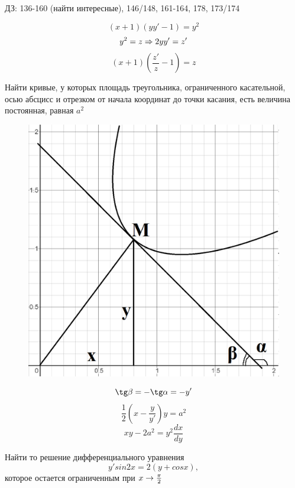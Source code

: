 \documentclass[12pt, fleqn]{article}
\begin{document}
    ДЗ: 136-160 (найти интересные), 146/148, 161-164, 178, 173/174

    \begin{Example}[162]
        \[(x+1)(y y'-1)=y^2\]
        \[y^2=z \Rightarrow 2y y'=z'\]
        \[(x+1)(\dfrac{z'}{z}-1)=z\]
    \end{Example}

    \begin{example}
      Найти кривые, у которых площадь треугольника, ограниченного касательной, осью абсцисс и отрезком от начала координат до точки касания, есть величина постоянная, равная $a^2$
      \begin{figure}[H]
    	    \includegraphics[scale=0.2]{pics/resh6.png}
    	    \centering
    	\end{figure}
      \[\tg \beta = - \tg \alpha = -y'\]
      \[\frac{1}{2} (x-\frac{y}{y'})y=a^2\]
      \[x y - 2a^2 = y^2 \frac{dx}{dy}\]
    \end{example}

    \begin{example}
      Найти то решение дифференциального уравнения
      \[y' sin 2x = 2(y + cos x),\]
      которое остается ограниченным при $x \rightarrow \frac{\pi}{2}$\\
    \end{example}
\end{document}
